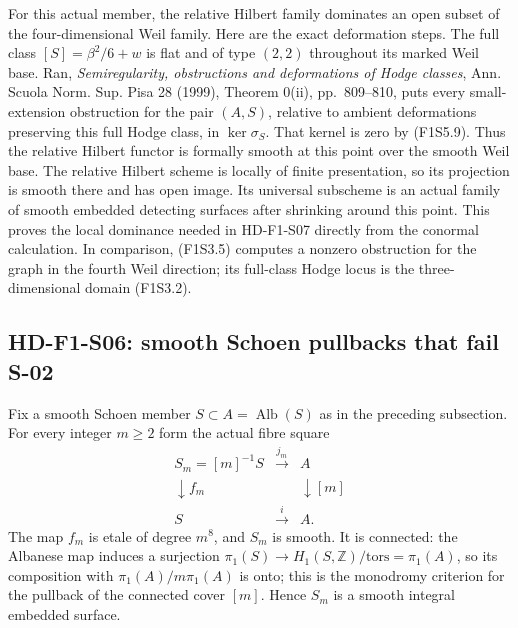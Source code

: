 For this actual member, the relative Hilbert family dominates
an open subset of the four-dimensional Weil family. Here are
the exact deformation steps. The full class
$[S]=\beta^2/6+w$ is flat and of type $(2,2)$ throughout its
marked Weil base. Ran, \emph{Semiregularity, obstructions and
deformations of Hodge classes}, Ann. Scuola Norm. Sup. Pisa
28 (1999), Theorem 0(ii), pp.~809--810, puts every
small-extension obstruction for the pair $(A,S)$, relative
to ambient deformations preserving this full Hodge class,
in $\ker\sigma_S$. That kernel is zero by (F1S5.9).
Thus the relative Hilbert functor is formally smooth at this
point over the smooth Weil base. The relative Hilbert scheme
is locally of finite presentation, so its projection is
smooth there and has open image. Its universal subscheme is
an actual family of smooth embedded detecting surfaces after
shrinking around this point. This proves the local dominance
needed in HD-F1-S07 directly from the conormal calculation.
In comparison, (F1S3.5) computes a nonzero obstruction for
the graph in the fourth Weil direction; its full-class
Hodge locus is the three-dimensional domain (F1S3.2).

\subsection{HD-F1-S06: smooth Schoen pullbacks that fail S-02}

Fix a smooth Schoen member $S\subset A=\operatorname{Alb}(S)$
as in the preceding subsection. For every integer $m\ge2$ form
the actual fibre square
\[
 \begin{array}{ccc}
 S_m=[m]^{-1}S&\xrightarrow{j_m}&A\\
 \downarrow f_m&&\downarrow[m]\\
 S&\xrightarrow{i}&A.
 \end{array}
 \tag{F1S6.1}
\]
The map $f_m$ is etale of degree $m^8$, and $S_m$ is smooth.
It is connected: the Albanese map induces a surjection
$\pi_1(S)\to H_1(S,\mathbb Z)/\mathrm{tors}=\pi_1(A)$,
so its composition with $\pi_1(A)/m\pi_1(A)$ is onto; this is
the monodromy criterion for the pullback of the connected
cover $[m]$. Hence $S_m$ is a smooth integral embedded surface.

